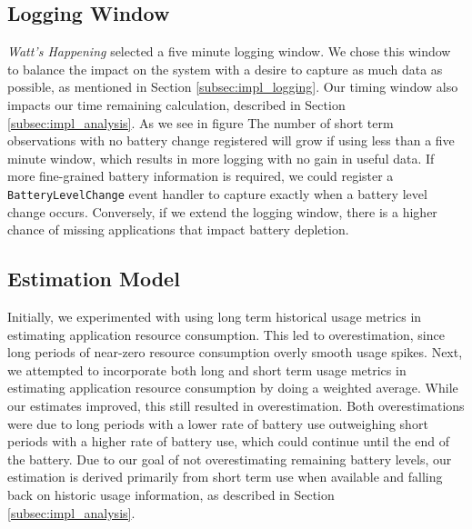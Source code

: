 \subsection{Logging Window}
\emph{Watt's Happening} selected a five minute logging window.
We chose this window to balance the impact on the system with a desire to capture as much data as possible, as mentioned in Section \ref{subsec:impl_logging}.
Our timing window also impacts our time remaining calculation, described in Section \ref{subsec:impl_analysis}.
As we see in figure %
The number of short term observations with no battery change registered will grow if using less than a five minute window, which results in more logging with no gain in useful data.
If more fine-grained battery information is required, we could register a \texttt{BatteryLevelChange} event handler to capture exactly when a battery level change occurs.
Conversely, if we extend the logging window, there is a higher chance of missing applications that impact battery depletion.

\subsection{Estimation Model}
Initially, we experimented with using long term historical usage metrics in estimating application resource consumption.
This led to overestimation, since long periods of near-zero resource consumption overly smooth usage spikes.
Next, we attempted to incorporate both long and short term usage metrics in estimating application resource consumption by doing a weighted average.
While our estimates improved, this still resulted in overestimation. 
Both overestimations were due to long periods with a lower rate of battery use outweighing short periods with a higher rate of battery use, which could continue until the end of the battery.
Due to our goal of not overestimating remaining battery levels, our estimation is derived primarily from short term use when available and falling back on historic usage information, as described in Section \ref{subsec:impl_analysis}.

